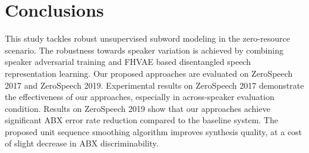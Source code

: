 \documentclass[a4paper]{article}
\begin{document}
\section{Conclusions}
This study tackles robust unsupervised subword modeling in the zero-resource scenario. The robustness  towards speaker variation is achieved by combining speaker adversarial training and FHVAE based disentangled speech representation learning. 
Our proposed approaches are evaluated on  ZeroSpeech 2017 and ZeroSpeech 2019. Experimental results on ZeroSpeech 2017 demonstrate the effectiveness of our approaches, especially in across-speaker evaluation condition. Results on ZeroSpeech 2019 show that our approaches achieve significant  ABX error rate reduction compared to the baseline system. 
The proposed unit sequence smoothing algorithm improves synthesis quality, at a cost of slight decrease in ABX discriminability.







\end{document}
